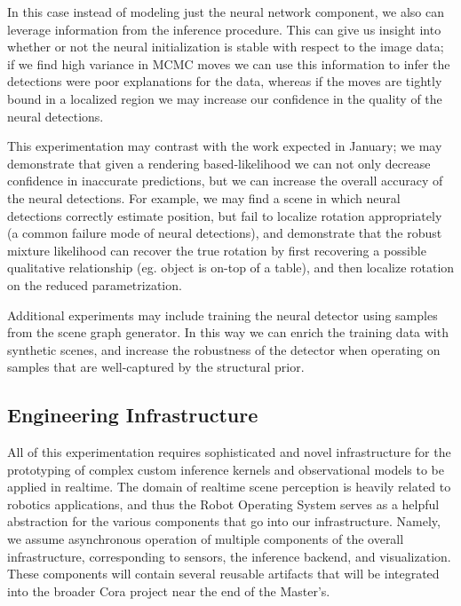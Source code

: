     In this case instead of modeling just the neural network component, we also
    can leverage information from the inference procedure. This can give us
    insight into whether or not the neural initialization is stable with
    respect to the image data; if we find high variance in MCMC moves we can
    use this information to infer the detections were poor explanations for the
    data, whereas if the moves are tightly bound in a localized region we may
    increase our confidence in the quality of the neural detections.

    This experimentation may contrast with the work expected in January; we
    may demonstrate that given a rendering based-likelihood we can not only
    decrease confidence in inaccurate predictions, but we can increase the
    overall accuracy of the neural detections. For example, we may find a scene
    in which neural detections correctly estimate position, but fail to
    localize rotation appropriately (a common failure mode of neural
    detections), and demonstrate that the robust mixture likelihood can recover
    the true rotation by first recovering a possible qualitative relationship
    (eg. object is on-top of a table), and then localize rotation on the
    reduced parametrization.

    Additional experiments may include training the neural detector using
    samples from the scene graph generator. In this way we can enrich the
    training data with synthetic scenes, and increase the robustness of the
    detector when operating on samples that are well-captured by the structural
    prior.

  \subsection{Engineering Infrastructure}

    All of this experimentation requires sophisticated and novel infrastructure
    for the prototyping of complex custom inference kernels and observational
    models to be applied in realtime. The domain of realtime scene perception
    is heavily related to robotics applications, and thus the Robot Operating
    System serves as a helpful abstraction for the various components that go
    into our infrastructure. Namely, we assume asynchronous operation of
    multiple components of the overall infrastructure, corresponding to
    sensors, the inference backend, and visualization. These components will
    contain several reusable artifacts that will be integrated into the broader
    Cora project near the end of the Master's.

